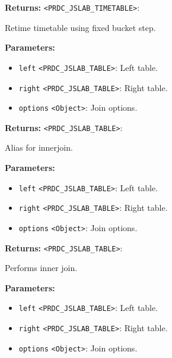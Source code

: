 \documentclass[12pt,a4paper]{article}
\begin{document}
\noindent \textbf{Returns:} \texttt{<PRDC\_JSLAB\_TIMETABLE>}:

\noindent Retime timetable using fixed bucket step.

\vspace{5mm}
\noindent {}


\noindent \textbf{Parameters:}
\begin{itemize}
  \item \texttt{left} \texttt{<PRDC\_JSLAB\_TABLE>}: Left table.
  \item \texttt{right} \texttt{<PRDC\_JSLAB\_TABLE>}: Right table.
  \item \texttt{options} \texttt{<Object>}: Join options.
\end{itemize}

\noindent \textbf{Returns:} \texttt{<PRDC\_JSLAB\_TABLE>}:

\noindent Alias for innerjoin.

\vspace{5mm}
\noindent {}


\noindent \textbf{Parameters:}
\begin{itemize}
  \item \texttt{left} \texttt{<PRDC\_JSLAB\_TABLE>}: Left table.
  \item \texttt{right} \texttt{<PRDC\_JSLAB\_TABLE>}: Right table.
  \item \texttt{options} \texttt{<Object>}: Join options.
\end{itemize}

\noindent \textbf{Returns:} \texttt{<PRDC\_JSLAB\_TABLE>}:

\noindent Performs inner join.

\vspace{5mm}
\noindent {}


\noindent \textbf{Parameters:}
\begin{itemize}
  \item \texttt{left} \texttt{<PRDC\_JSLAB\_TABLE>}: Left table.
  \item \texttt{right} \texttt{<PRDC\_JSLAB\_TABLE>}: Right table.
  \item \texttt{options} \texttt{<Object>}: Join options.
\end{itemize}
\end{document}
